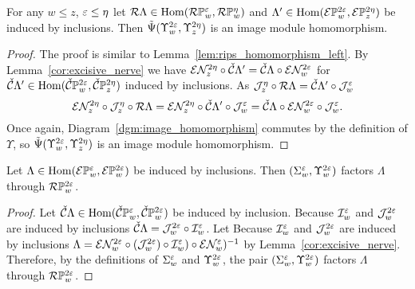 \begin{lemma}\label{lem:rips_homomorphism_right}
  For any $w\leq z$, $\e\leq\eta$ let $\rips\Lambda\in\Hom(\RPP{w}{\e},\RPP{w}{\eta})$ and $\Lambda'\in\Hom(\ext{\PP{w}{2\e}},\ext{\PP{z}{2\eta}})$ be induced by inclusions.
  Then $\tilde{\Psi}(\Upsilon_w^{2\e},\Upsilon_z^{2\eta})$ is an image module homomorphism.
\end{lemma}
\begin{proof}
  The proof is similar to Lemma~\ref{lem:rips_homomorphism_left}.
  By Lemma~\ref{cor:excisive_nerve} we have $\E\N_z^{2\eta} \circ\cech\Lambda'  = \cech \Lambda\circ \E\N_w^{2\e}$ for $\cech\Lambda'\in\Hom(\CPP{w}{2\e},\CPP{z}{2\eta})$ induced by inclusions.
  As $\J_z^\eta\circ \rips\Lambda = \cech\Lambda'\circ\J_w^\e$
  \[ \E\N_z^{2\eta}\circ \J_z^\eta\circ \rips\Lambda = \E\N_z^{2\eta}\circ\cech\Lambda'\circ\J_w^\e = \cech \Lambda\circ \E\N_w^{2\e}\circ\J_w^\e.\]
  Once again, Diagram~\ref{dgm:image_homomorphism} commutes by the definition of $\Upsilon$, so $\tilde{\Psi}(\Upsilon_w^{2\e},\Upsilon_z^{2\eta})$ is an image module homomorphism.
\end{proof}

\begin{lemma}\label{lem:weak_rips_left}
  Let $\Lambda\in\Hom(\ext{\PP{w}{\e}}, \ext{\PP{w}{2\e}})$ be induced by inclusions.
  Then $(\Sigma_w^\e, \Upsilon_w^{2\e})$ factors $\Lambda$ through $\RPP{w}{2\e}$.
\end{lemma}
\begin{proof}
  Let $\cech\Lambda\in\Hom(\CPP{w}{\e},\CPP{w}{2\e})$ be induced by inclusion.
  Because $\I_w^\e$ and $\J_w^{2\e}$ are induced by inclusions $\cech\Lambda = \J_w^{2\e}\circ \I_w^\e$.
  Let
  Because $\I_w^\e$ and $\J_w^{2\e}$ are induced by inclusions $\Lambda = \E\N_w^{2\e}\circ (\J_w^{2\e})\circ \I_w^\e)\circ \E\N_w^\e)^{-1}$ by Lemma~\ref{cor:excisive_nerve}.
  Therefore, by the definitions of $\Sigma_w^\e$ and $\Upsilon_w^{2\e}$, the pair $(\Sigma_w^\e, \Upsilon_w^{2\e})$ factors $\Lambda$ through $\RPP{w}{2\e}$.
\end{proof}

